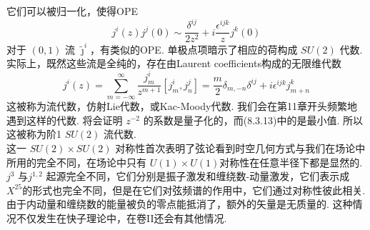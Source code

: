 它们可以被归一化，使得OPE
\begin{equation}
	j^{i}(z) j^{j}(0) \sim \frac{\delta^{i j}}{2 z^{2}}+i \frac{\epsilon^{i j k}}{z} j^{k}(0)
\end{equation}
对于 $(0,1)$ 流 $\tilde{\jmath}^{i} $，有类似的OPE. 单极点项暗示了相应的荷构成 $S U(2)$ 代数. 实际上，既然这些流是全纯的，存在由Laurent coefficients构成的无限维代数
\begin{subequations}
\begin{equation}
		j^{i}(z) =\sum_{m=-\infty}^{\infty} \frac{j_{m}^{i}}{z^{m+1}} 
\end{equation}
\begin{equation}		
		\left[j_{m}^{i}, j_{n}^{j}\right] =\frac{m}{2} \delta_{m,-n} \delta^{i j}+i \epsilon^{i j k} j_{m+n}^{k}
\end{equation}
\end{subequations}
这被称为流代数，仿射Lie代数，或Kac-Moody代数. 我们会在第11章开头频繁地遇到这样的代数. 将会证明 $z^{-2}$ 的系数是量子化的，而(8.3.13)中的是最小值. 所以这被称为阶1 $S U(2)$ 流代数.\\
这一 $S U(2) \times S U(2)$ 对称性首次表明了弦论看到时空几何方式与我们在场论中所用的完全不同，在场论中只有 $U(1) \times U(1)$对称性在任意半径下都是显然的.  $j^{3}$ 与$j^{1,2}$ 起源完全不同，它们分别是振子激发和缠绕数-动量激发，它们表示成 $X^{25}$的形式也完全不同，但是在它们对弦频谱的作用中，它们通过对称性彼此相关. 由于内动量和缠绕数的能量被负的零点能抵消了，额外的矢量是无质量的. 这种情况不仅发生在快子理论中，在卷II还会有其他情况.

